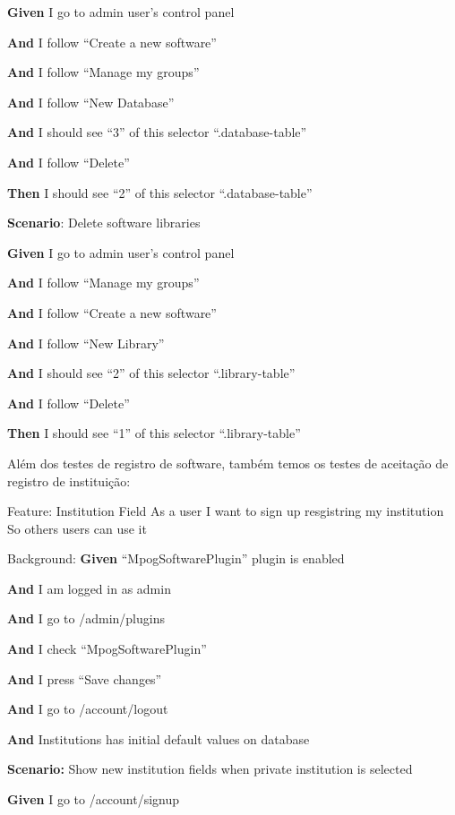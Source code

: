     \textbf{Given} I go to admin user's control panel
  
     \textbf{And} I follow ``Create a new software''
  
     \textbf{And} I follow ``Manage my groups''
  
     \textbf{And} I follow ``New Database''
  
     \textbf{And} I should see ``3'' of this selector ``.database-table''
  
     \textbf{And} I follow ``Delete''
  
    \textbf{Then} I should see ``2'' of this selector ``.database-table''
   

  
  \textbf{Scenario}: Delete software libraries
  
    \textbf{Given} I go to admin user's control panel
  
    \textbf{And} I follow ``Manage my groups''
  
    \textbf{And} I follow ``Create a new software''
  
    \textbf{And} I follow ``New Library''
  
    \textbf{And} I should see ``2'' of this selector ``.library-table''
  
    \textbf{And} I follow ``Delete''
  
   \textbf{Then} I should see ``1'' of this selector ``.library-table''

Além dos testes de registro de software, também temos os testes de aceitação de registro de instituição:

Feature: Institution Field
  As a user
  I want to sign up resgistring my institution
  So others users can use it

  Background:
    \textbf{Given} ``MpogSoftwarePlugin'' plugin is enabled
    
    \textbf{And} I am logged in as admin
    
    \textbf{And} I go to /admin/plugins
    
    \textbf{And} I check ``MpogSoftwarePlugin''
    
    \textbf{And} I press ``Save changes''
    
    \textbf{And} I go to /account/logout
    
    \textbf{And} Institutions has initial default values on database

  
   \textbf{Scenario:} Show new institution fields when private institution is selected
    
    \textbf{Given} I go to /account/signup
    
